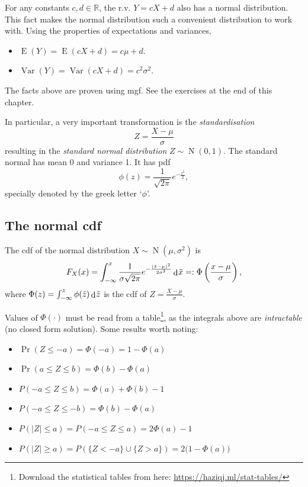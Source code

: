 \documentclass[
]{book}
\providecommand{\tightlist}{%
  \setlength{\itemsep}{0pt}\setlength{\parskip}{0pt}}
\DeclareMathOperator{\E}{E}
\DeclareMathOperator{\Var}{Var}
\DeclareMathOperator{\N}{N}
\newcommand{\bbR}{\mathbb{R}}
\DeclareMathOperator{\dd}{d}
\newcommand{\dint}{\dd\hspace{0.5pt}\!}
\theoremstyle{definition}
\theoremstyle{definition}
\theoremstyle{definition}
\theoremstyle{definition}
\theoremstyle{remark}
\begin{document}
For any constants \(c, d \in \bbR\), the r.v. \(Y=cX + d\) also has a normal distribution.
This fact makes the normal distribution such a convenient distribution to work with.
Using the properties of expectations and variances,

\begin{itemize}
\tightlist
\item
  \(\E(Y)=\E(cX+d)=c\mu + d\).
\item
  \(\Var(Y) = \Var(cX+d) = c^2 \sigma^2\).
\end{itemize}

The facts above are proven using mgf. See the exercises at the end of this chapter.

In particular, a very important transformation is the \emph{standardisation}
\[
  Z = \frac{X-\mu}{\sigma}
\]
resulting in the \emph{standard normal distribution} \(Z\sim\N(0,1)\).
The standard normal has mean 0 and variance 1.
It has pdf
\[
\phi(z) = \frac{1}{\sqrt{2\pi}}e^{-\frac{z^2}{2}},
\]
specially denoted by the greek letter `\(\phi\)'.

\hypertarget{the-normal-cdf}{%
\subsection{The normal cdf}\label{the-normal-cdf}}

The cdf of the normal distribution \(X\sim\N(\mu,\sigma^2)\) is
\[
F_X(x) = \int_{-\infty}^x 
\frac{1}{\sigma\sqrt{2\pi}}e^{-\frac{(\tilde x-\mu)^2}{2\sigma^2}} \dint \tilde x =: \Phi\left(\frac{x-\mu}{\sigma} \right),
\]
where \(\Phi(z)=\int_{-\infty}^z \phi(\tilde z) \dint \tilde z\) is the cdf of \(Z=\frac{X-\mu}{\sigma}\).

Values of \(\Phi(\cdot)\) must be read from a table\footnote{Download the statistical tables from here: \url{https://haziqj.ml/stat-tables/}}, as the integrals above are \emph{intractable} (no closed form solution).
Some results worth noting:

\begin{itemize}
\tightlist
\item
  \(\Pr(Z \leq -a)=\Phi(-a)=1-\Phi(a)\)
\item
  \(\Pr(a \leq Z \leq b) = \Phi(b) - \Phi(a)\)
\item
  \(P(-a \leq Z \leq b) = \Phi(a) + \Phi(b) - 1\)
\item
  \(P(-a \leq Z \leq -b) = \Phi(b) - \Phi(a)\)
\item
  \(P(|Z| \leq a) = P(-a \leq Z \leq a) = 2\Phi(a) - 1\)
\item
  \(P(|Z| \geq a) = P(\{Z < -a\} \cup \{Z >a\}) = 2\big(1-\Phi(a)\big)\)
\end{itemize}
\end{document}
